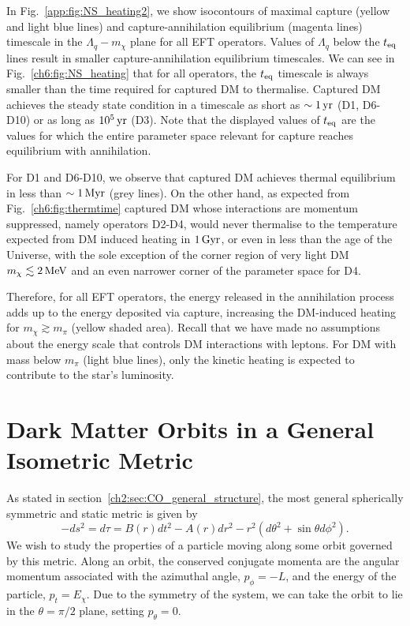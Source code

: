 In Fig.~\ref{app:fig:NS_heating2}, we show isocontours of maximal capture (yellow and light blue lines) and capture-annihilation equilibrium (magenta lines) timescale in the $\Lambda_q-m_\chi$ plane for all  EFT operators.  
Values of $\Lambda_q$ below the $t_{\rm eq}$ lines result in smaller capture-annihilation equilibrium timescales. 
We can see in Fig.~\ref{ch6:fig:NS_heating} that for all operators, the $t_{\rm eq}$ timescale is always smaller than the time required for captured DM to thermalise. Captured DM achieves the steady state condition in a timescale as short as $\sim1{\rm \,yr}$ (D1, D6-D10) or as long as $10^5{\rm \,yr}$ (D3). 
Note that the displayed values of $t_{\rm eq}$ are the values for which the entire parameter space relevant for capture reaches equilibrium with annihilation. 

For D1 and D6-D10, we observe that captured DM achieves thermal equilibrium in less than $\sim 1{\rm \,Myr}$ (grey lines). 
On the other hand, as expected from Fig.~\ref{ch6:fig:thermtime} captured DM whose interactions are momentum suppressed, namely operators D2-D4, would never thermalise to the temperature expected from DM induced heating in $1{\rm \,Gyr}$, or even in less than the age of the 
Universe,
with the sole exception of the corner region of very light DM $m_\chi\lesssim 2{\rm \,MeV}$ and an even narrower corner of the parameter space for D4. 

Therefore, for all EFT operators,  the energy released in the annihilation process adds up to the energy deposited via capture, increasing the DM-induced heating  
for $m_\chi\gtrsim m_\pi$ (yellow shaded area). 
Recall that we have made no assumptions about the energy scale that controls DM interactions with leptons. 
For DM with mass below $m_\pi$ (light blue lines), only the kinetic heating is expected to contribute to the star's luminosity.  

\section{Dark Matter Orbits in a General Isometric Metric}
\label{app:sec:DM_orbits}

As stated in section~\ref{ch2:sec:CO_general_structure}, the most general spherically symmetric and static metric is given by
\begin{equation}
    -ds^2 = d\tau = B(r) dt^2 - A(r) dr^2 - r^2( d\theta^2+ \sin\theta d\phi^2).
\end{equation}
We wish to study the properties of a particle moving along some orbit governed by this metric. 
Along an orbit, the conserved conjugate momenta are the angular momentum associated with the azimuthal angle, $p_\phi = -L$, 
and the energy of the particle, $p_t = E_\chi$. Due to the symmetry of the system, we can take the orbit to lie in the $\theta = \pi/2$ plane, setting $p_\theta = 0$. 

